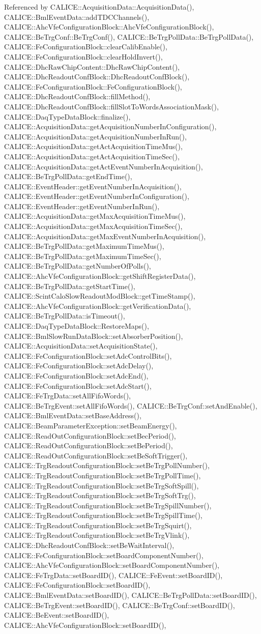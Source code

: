 Referenced by CALICE::AcquisitionData::AcquisitionData(), CALICE::BmlEventData::addTDCChannels(), CALICE::AhcVfeConfigurationBlock::AhcVfeConfigurationBlock(), CALICE::BeTrgConf::BeTrgConf(), CALICE::BeTrgPollData::BeTrgPollData(), CALICE::FeConfigurationBlock::clearCalibEnable(), CALICE::FeConfigurationBlock::clearHoldInvert(), CALICE::DhcRawChipContent::DhcRawChipContent(), CALICE::DhcReadoutConfBlock::DhcReadoutConfBlock(), CALICE::FeConfigurationBlock::FeConfigurationBlock(), CALICE::DhcReadoutConfBlock::fillMethod(), CALICE::DhcReadoutConfBlock::fillSlotToWordsAssociationMask(), CALICE::DaqTypeDataBlock::finalize(), CALICE::AcquisitionData::getAcquisitionNumberInConfiguration(), CALICE::AcquisitionData::getAcquisitionNumberInRun(), CALICE::AcquisitionData::getActAcquisitionTimeMus(), CALICE::AcquisitionData::getActAcquisitionTimeSec(), CALICE::AcquisitionData::getActEventNumberInAcquisition(), CALICE::BeTrgPollData::getEndTime(), CALICE::EventHeader::getEventNumberInAcquisition(), CALICE::EventHeader::getEventNumberInConfiguration(), CALICE::EventHeader::getEventNumberInRun(), CALICE::AcquisitionData::getMaxAcquisitionTimeMus(), CALICE::AcquisitionData::getMaxAcquisitionTimeSec(), CALICE::AcquisitionData::getMaxEventNumberInAcquisition(), CALICE::BeTrgPollData::getMaximumTimeMus(), CALICE::BeTrgPollData::getMaximumTimeSec(), CALICE::BeTrgPollData::getNumberOfPolls(), CALICE::AhcVfeConfigurationBlock::getShiftRegisterData(), CALICE::BeTrgPollData::getStartTime(), CALICE::ScintCaloSlowReadoutModBlock::getTimeStamp(), CALICE::AhcVfeConfigurationBlock::getVerificationData(), CALICE::BeTrgPollData::isTimeout(), CALICE::DaqTypeDataBlock::RestoreMaps(), CALICE::BmlSlowRunDataBlock::setAbsorberPosition(), CALICE::AcquisitionData::setAcquisitionState(), CALICE::FeConfigurationBlock::setAdcControlBits(), CALICE::FeConfigurationBlock::setAdcDelay(), CALICE::FeConfigurationBlock::setAdcEnd(), CALICE::FeConfigurationBlock::setAdcStart(), CALICE::FeTrgData::setAllFifoWords(), CALICE::BeTrgEvent::setAllFifoWords(), CALICE::BeTrgConf::setAndEnable(), CALICE::BmlEventData::setBaseAddress(), CALICE::BeamParameterException::setBeamEnergy(), CALICE::ReadOutConfigurationBlock::setBecPeriod(), CALICE::ReadOutConfigurationBlock::setBePeriod(), CALICE::ReadOutConfigurationBlock::setBeSoftTrigger(), CALICE::TrgReadoutConfigurationBlock::setBeTrgPollNumber(), CALICE::TrgReadoutConfigurationBlock::setBeTrgPollTime(), CALICE::TrgReadoutConfigurationBlock::setBeTrgSoftSpill(), CALICE::TrgReadoutConfigurationBlock::setBeTrgSoftTrg(), CALICE::TrgReadoutConfigurationBlock::setBeTrgSpillNumber(), CALICE::TrgReadoutConfigurationBlock::setBeTrgSpillTime(), CALICE::TrgReadoutConfigurationBlock::setBeTrgSquirt(), CALICE::TrgReadoutConfigurationBlock::setBeTrgVlink(), CALICE::DhcReadoutConfBlock::setBeWaitInterval(), CALICE::FeConfigurationBlock::setBoardComponentNumber(), CALICE::AhcVfeConfigurationBlock::setBoardComponentNumber(), CALICE::FeTrgData::setBoardID(), CALICE::FeEvent::setBoardID(), CALICE::FeConfigurationBlock::setBoardID(), CALICE::BmlEventData::setBoardID(), CALICE::BeTrgPollData::setBoardID(), CALICE::BeTrgEvent::setBoardID(), CALICE::BeTrgConf::setBoardID(), CALICE::BeEvent::setBoardID(), CALICE::AhcVfeConfigurationBlock::setBoardID(), 